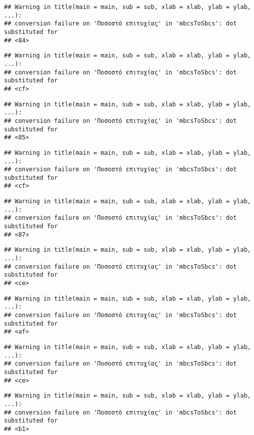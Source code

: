 \documentclass[
]{article}
\begin{document}
\begin{verbatim}
## Warning in title(main = main, sub = sub, xlab = xlab, ylab = ylab, ...):
## conversion failure on 'Ποσοστό επιτυχίας' in 'mbcsToSbcs': dot substituted for
## <84>
\end{verbatim}

\begin{verbatim}
## Warning in title(main = main, sub = sub, xlab = xlab, ylab = ylab, ...):
## conversion failure on 'Ποσοστό επιτυχίας' in 'mbcsToSbcs': dot substituted for
## <cf>
\end{verbatim}

\begin{verbatim}
## Warning in title(main = main, sub = sub, xlab = xlab, ylab = ylab, ...):
## conversion failure on 'Ποσοστό επιτυχίας' in 'mbcsToSbcs': dot substituted for
## <85>
\end{verbatim}

\begin{verbatim}
## Warning in title(main = main, sub = sub, xlab = xlab, ylab = ylab, ...):
## conversion failure on 'Ποσοστό επιτυχίας' in 'mbcsToSbcs': dot substituted for
## <cf>
\end{verbatim}

\begin{verbatim}
## Warning in title(main = main, sub = sub, xlab = xlab, ylab = ylab, ...):
## conversion failure on 'Ποσοστό επιτυχίας' in 'mbcsToSbcs': dot substituted for
## <87>
\end{verbatim}

\begin{verbatim}
## Warning in title(main = main, sub = sub, xlab = xlab, ylab = ylab, ...):
## conversion failure on 'Ποσοστό επιτυχίας' in 'mbcsToSbcs': dot substituted for
## <ce>
\end{verbatim}

\begin{verbatim}
## Warning in title(main = main, sub = sub, xlab = xlab, ylab = ylab, ...):
## conversion failure on 'Ποσοστό επιτυχίας' in 'mbcsToSbcs': dot substituted for
## <af>
\end{verbatim}

\begin{verbatim}
## Warning in title(main = main, sub = sub, xlab = xlab, ylab = ylab, ...):
## conversion failure on 'Ποσοστό επιτυχίας' in 'mbcsToSbcs': dot substituted for
## <ce>
\end{verbatim}

\begin{verbatim}
## Warning in title(main = main, sub = sub, xlab = xlab, ylab = ylab, ...):
## conversion failure on 'Ποσοστό επιτυχίας' in 'mbcsToSbcs': dot substituted for
## <b1>
\end{verbatim}
\end{document}
